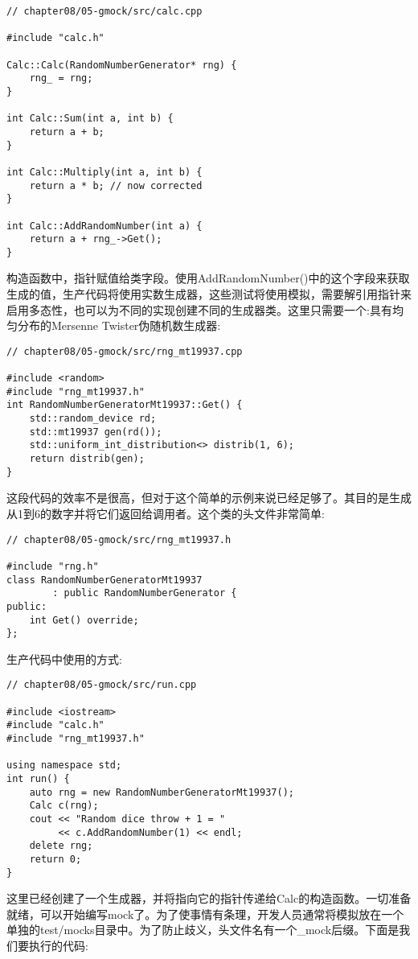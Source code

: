 \begin{lstlisting}[style=styleCXX]
// chapter08/05-gmock/src/calc.cpp

#include "calc.h"

Calc::Calc(RandomNumberGenerator* rng) {
	rng_ = rng;
}

int Calc::Sum(int a, int b) {
	return a + b;
}

int Calc::Multiply(int a, int b) {
	return a * b; // now corrected
}

int Calc::AddRandomNumber(int a) {
	return a + rng_->Get();
}
\end{lstlisting}

构造函数中，指针赋值给类字段。使用AddRandomNumber()中的这个字段来获取生成的值，生产代码将使用实数生成器，这些测试将使用模拟，需要解引用指针来启用多态性，也可以为不同的实现创建不同的生成器类。这里只需要一个:具有均匀分布的Mersenne Twister伪随机数生成器:

\begin{lstlisting}[style=styleCXX]
// chapter08/05-gmock/src/rng_mt19937.cpp

#include <random>
#include "rng_mt19937.h"
int RandomNumberGeneratorMt19937::Get() {
	std::random_device rd;
	std::mt19937 gen(rd());
	std::uniform_int_distribution<> distrib(1, 6);
	return distrib(gen);
}
\end{lstlisting}

这段代码的效率不是很高，但对于这个简单的示例来说已经足够了。其目的是生成从1到6的数字并将它们返回给调用者。这个类的头文件非常简单:

\begin{lstlisting}[style=styleCXX]
// chapter08/05-gmock/src/rng_mt19937.h

#include "rng.h"
class RandomNumberGeneratorMt19937
		: public RandomNumberGenerator {
public:
	int Get() override;
};
\end{lstlisting}

生产代码中使用的方式:

\begin{lstlisting}[style=styleCXX]
// chapter08/05-gmock/src/run.cpp

#include <iostream>
#include "calc.h"
#include "rng_mt19937.h"

using namespace std;
int run() {
	auto rng = new RandomNumberGeneratorMt19937();
	Calc c(rng);
	cout << "Random dice throw + 1 = "
		 << c.AddRandomNumber(1) << endl;
	delete rng;
	return 0;
}
\end{lstlisting}

这里已经创建了一个生成器，并将指向它的指针传递给Calc的构造函数。一切准备就绪，可以开始编写mock了。为了使事情有条理，开发人员通常将模拟放在一个单独的test/mocks目录中。为了防止歧义，头文件名有一个\_mock后缀。下面是我们要执行的代码:

